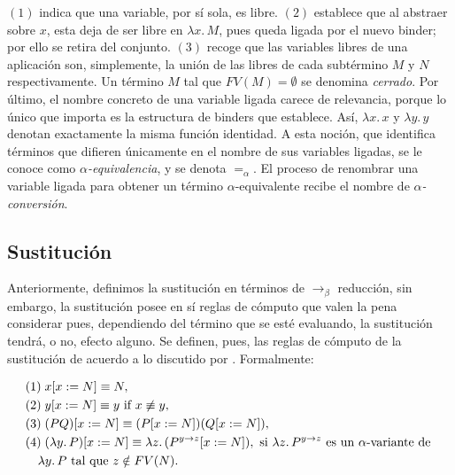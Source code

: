 $(1)$ indica que una variable, por s\'i sola, es libre. $(2)$ establece
que al abstraer sobre $x$, esta deja de ser libre en $\lambda x.\, M$, pues queda ligada por
el nuevo binder; por ello se retira del conjunto. $(3)$ recoge que las variables libres de
una aplicaci\'on son, simplemente, la uni\'on de las libres de cada subt\'ermino $M$ y $N$ respectivamente. Un t\'ermino
$M$ tal que $FV(M) = \emptyset$ se denomina \textit{cerrado}.
\newline
\newline
Por último, el nombre concreto de una variable ligada carece de relevancia, porque lo único que importa es la estructura de binders que establece. Así, $\lambda x.\, x$ y $\lambda y.\, y$ denotan exactamente la misma funci\'on identidad. A esta noci\'on, que identifica t\'erminos que difieren \'unicamente en el nombre de sus variables ligadas, se le conoce como \textit{$\alpha$-equivalencia}, y se denota $=_\alpha$. El proceso de renombrar una variable ligada para obtener un t\'ermino $\alpha$-equivalente recibe el nombre de \textit{$\alpha$-conversión}.

\subsection{Sustitución}
Anteriormente, definimos la sustitución en términos de $\to_\beta$ reducción, sin embargo, la sustitución posee en sí reglas de cómputo que valen la pena considerar pues, dependiendo del término que se esté evaluando, la sustitución tendrá, o no, efecto alguno.
\newline
\newline
Se definen, pues, las reglas de cómputo de la sustitución de acuerdo a lo discutido por \cite{pierce2002}. Formalmente:

\begin{align}
& (1) \; x[x := N] \equiv N, \notag \\
& (2) \; y[x := N] \equiv y \text{ if } x \not\equiv y, \notag \\
& (3) \; (PQ)[x := N] \equiv (P[x := N])(Q[x := N]), \notag \\
& (4) \; (\lambda y.\, P)[x := N] \equiv \lambda z.\, (P^{y \to z}[x := N]),
  \text{ si } \lambda z.\, P^{y \to z} \text{ es un } \alpha\text{-variante de } \notag \\
& \quad \lambda y.\, P \text{ tal que } z \notin FV(N). \notag
\end{align}

